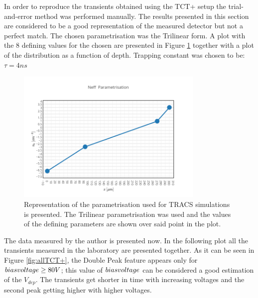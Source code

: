 
In order to reproduce the transients obtained using the TCT+ setup the trial-and-error method was performed manually. The results presented in this section are considered to be a good representation of the measured detector but not a perfect match. The chosen \neff parametrisation was the Trilinear form. A plot with the 8 defining values for the chosen \neff are presented in Figure \ref{fig:TRACSparam} together with a plot of the \neff distribution as a function of depth. Trapping constant was chosen to be: $\tau = 4 ns$

\begin{figure}[H]
	\centering
	\includegraphics[width=0.8\textwidth]{Neff.png}
	\caption{Representation of the \neff parametrisation used for TRACS simulations is presented. The Trilinear parametrisation was used and the values of the defining parameters are shown over said point in the plot.}
	\label{fig:TRACSparam}
\end{figure}

The data measured by the author is presented now. In the following plot all the transients measured in the laboratory are presented together. As it can be seen in Figure \ref{fig:allTCT+}, the Double Peak feature appears only for $bias voltage \geq 80 V$; this value of $bias voltage$ can be considered a good estimation of the $V_{dep}$. The transients get shorter in time with increasing voltages and the second peak getting higher with higher voltages. 

